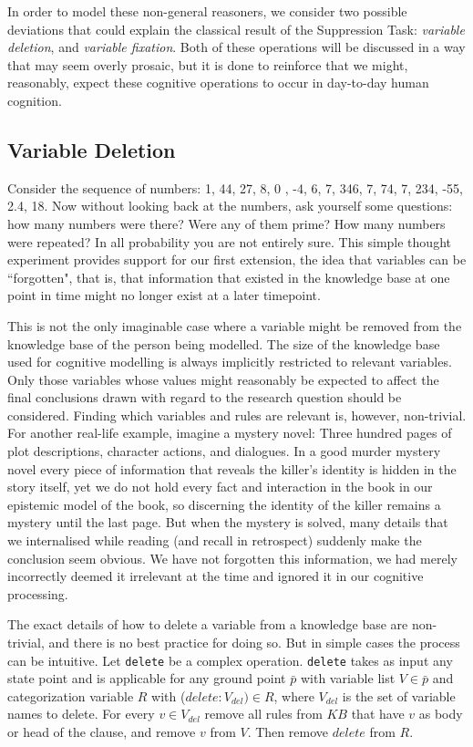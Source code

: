 \documentclass[
11pt, %
english, %
singlespacing, %
headsepline, %
]{MastersDoctoralThesis} %
\begin{document}
In order to model these non-general reasoners, we consider two possible deviations that could explain the classical result of the Suppression Task: \textit{variable deletion}, and\textit{ variable fixation}. Both of these operations will be discussed in a way that may seem overly prosaic, but it is done to reinforce that we might, reasonably, expect these cognitive operations to occur in day-to-day human cognition.

\subsection*{Variable Deletion} \label{ssec:variableDeletion}
Consider the sequence of numbers: 1, 44, 27, 8, 0 , -4, 6, 7, 346, 7, 74, 7, 234, -55, 2.4, 18. Now without looking back at the numbers, ask yourself some questions: how many numbers were there? Were any of them prime? How many numbers were repeated? In all probability you are not entirely sure. This simple thought experiment provides support for our first extension, the idea that variables can be ``forgotten", that is, that information that existed in the knowledge base at one point in time might no longer exist at a later timepoint. 

This is not the only imaginable case where a variable might be removed from the knowledge base of the person being modelled. The size of the knowledge base used for cognitive modelling is always implicitly restricted to relevant variables. Only those variables whose values might reasonably be expected to affect the final conclusions drawn with regard to the research question should be considered. Finding which variables and rules are relevant is, however, non-trivial. For another real-life example, imagine a mystery novel: Three hundred pages of plot descriptions, character actions, and dialogues. In a good murder mystery novel every piece of information that reveals the killer's identity is hidden in the story itself, yet we do not hold every fact and interaction in the book in our epistemic model of the book, so discerning the identity of the killer remains a mystery until the last page. But when the mystery is solved, many details that we internalised while reading (and recall in retrospect) suddenly make the conclusion seem obvious. We have not forgotten this information, we had merely incorrectly deemed it irrelevant at the time and ignored it in our cognitive processing.

The exact details of how to delete a variable from a knowledge base are non-trivial, and there is no best practice for doing so. But in simple cases the process can be intuitive. Let \texttt{delete} be a complex operation. \texttt{delete} takes as input any state point and is applicable for any ground point $\bar{p}$ with variable list $V \in \bar{p}$ and categorization variable $R$ with ($delete:V_{del}) \in R$, where $V_{del}$ is the set of variable names to delete. For every $v \in V_{del}$ remove all rules from $KB$ that have $v$ as body or head of the clause, and remove $v$ from $V$. Then remove $delete$ from $R$.
\end{document}
